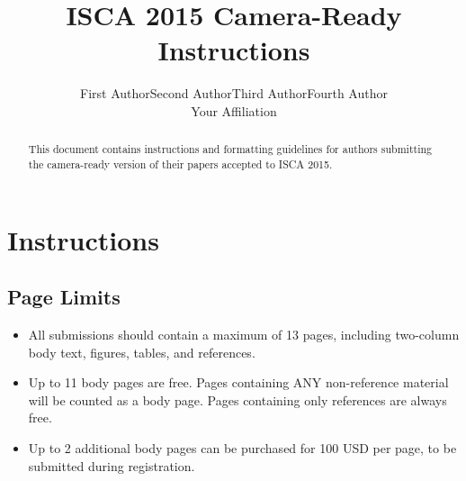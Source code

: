 \documentclass[final,nopageno]{jpaper}
\begin{document}
\title{ISCA 2015 Camera-Ready Instructions}
\author{
  First Author\quad Second Author\quad Third Author\quad Fourth Author\\
  Your Affiliation\\
}
\date{}


\maketitle
 
 


\thispagestyle{empty}

\begin{abstract}
This document contains instructions and formatting guidelines
for authors submitting the camera-ready version of their papers
accepted to ISCA 2015.
\end{abstract}


\section{Instructions}
\subsection{Page Limits}
\begin{itemize}
    \item All submissions should contain a maximum of 13 pages, including two-column body text, figures, tables, and references.
    \item Up to 11 body pages are free.  Pages containing ANY non-reference material will be counted as a body page. Pages containing only references are always free.
    \item Up to 2 additional body pages can be purchased for 100 USD per page, to be submitted during registration.
\end{itemize}
\end{document}
